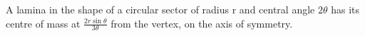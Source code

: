  A lamina in the shape of a circular sector of 
radius r and central angle $ 2 \theta $
has its centre of mass at $ \frac{2 r \sin \theta }{3 \theta } $
from the vertex, on the  axis of symmetry.

